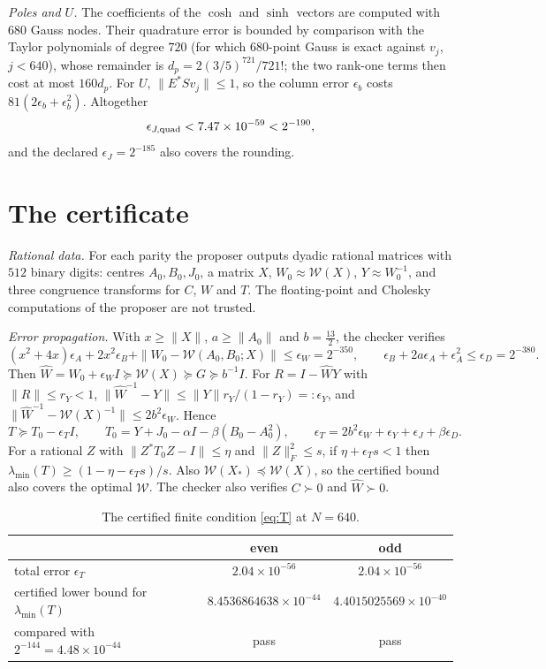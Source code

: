 \documentclass[11pt]{amsart}
\theoremstyle{remark}
\numberwithin{equation}{section}
\begin{document}
\emph{Poles and $U$.} The coefficients of the $\cosh$ and $\sinh$ vectors are computed with $680$ Gauss nodes. Their quadrature error is bounded by comparison with the Taylor polynomials of degree $720$ (for which $680$-point Gauss is exact against $v_j$, $j<640$), whose remainder is $d_p=2(3/5)^{721}/721!$; the two rank-one terms then cost at most $160d_p$. For $U$, $\|E^*Sv_j\|\le1$, so the column error $\epsilon_b$ costs $81(2\epsilon_b+\epsilon_b^2)$. Altogether
\[
\epsilon_{J,\rm quad}<7.47\times10^{-59}<2^{-190},
\]
and the declared $\epsilon_J=2^{-185}$ also covers the rounding.

\section{The certificate}\label{sec:certificate}

\emph{Rational data.} For each parity the proposer outputs dyadic rational matrices with $512$ binary digits: centres $A_0,B_0,J_0$, a matrix $X$, $W_0\approx\mathcal W(X)$, $Y\approx W_0^{-1}$, and three congruence transforms for $C$, $W$ and $T$. The floating-point and Cholesky computations of the proposer are not trusted.

\emph{Error propagation.} With $x\ge\|X\|$, $a\ge\|A_0\|$ and $b=\frac{13}2$, the checker verifies
\[
(x^2+4x)\epsilon_A+2x^2\epsilon_B+\|W_0-\mathcal W(A_0,B_0;X)\|\le\epsilon_W=2^{-350},\qquad
\epsilon_B+2a\epsilon_A+\epsilon_A^2\le\epsilon_D=2^{-380}.
\]
Then $\widehat W=W_0+\epsilon_WI\succeq\mathcal W(X)\succeq G\succeq b^{-1}I$. For $R=I-\widehat WY$ with $\|R\|\le r_Y<1$, $\|\widehat W^{-1}-Y\|\le\|Y\|r_Y/(1-r_Y)=:\epsilon_Y$, and $\|\widehat W^{-1}-\mathcal W(X)^{-1}\|\le2b^2\epsilon_W$. Hence
\[
T\succeq T_0-\epsilon_TI,\qquad T_0=Y+J_0-\alpha I-\beta(B_0-A_0^2),\qquad
\epsilon_T=2b^2\epsilon_W+\epsilon_Y+\epsilon_J+\beta\epsilon_D .
\]
For a rational $Z$ with $\|Z^*T_0Z-I\|\le\eta$ and $\|Z\|_F^2\le s$, if $\eta+\epsilon_Ts<1$ then $\lambda_{\min}(T)\ge(1-\eta-\epsilon_Ts)/s$. Also $\mathcal W(X_*)\preceq\mathcal W(X)$, so the certified bound also covers the optimal $\mathcal W$. The checker also verifies $C\succ0$ and $\widehat W\succ0$.

\begin{table}[h]
\centering\small
\begin{tabular}{lcc}
\toprule
& even & odd\\
\midrule
total error $\epsilon_T$ & $2.04\times10^{-56}$ & $2.04\times10^{-56}$\\
certified lower bound for $\lambda_{\min}(T)$ & $8.4536864638\times10^{-44}$ & $4.4015025569\times10^{-40}$\\
compared with $2^{-144}=4.48\times10^{-44}$ & pass & pass\\
\bottomrule
\end{tabular}
\caption{The certified finite condition \eqref{eq:T} at $N=640$.}
\end{table}
\end{document}
